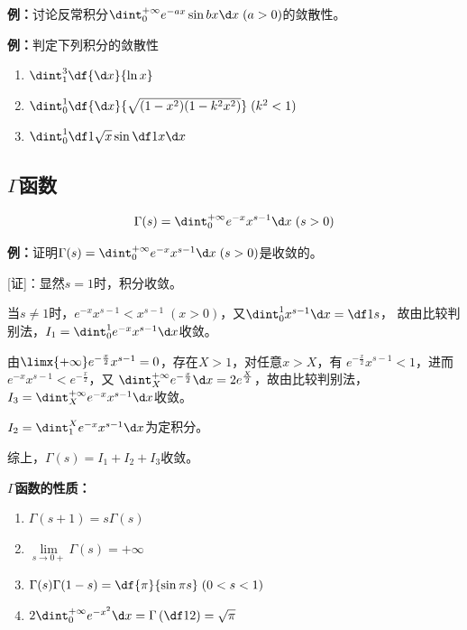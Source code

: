 {\bf 例：}讨论反常积分$\dint_0^{+\infty}e^{-ax}\sin bx\d x\;(a>0)$的敛散性。

{\bf 例：}判定下列积分的敛散性
\begin{enumerate}[(1)]
  \setlength{\itemindent}{1cm}
  \item $\dint_1^3\df{\d x}{\ln x}$ 
  \item $\dint_0^1\df{\d x}{\sqrt{(1-x^2)(1-k^2x^2)}}\;(k^2<1)$ 
  \item $\dint_0^1\df 1{\sqrt{x}}\sin\df 1x\d x$
\end{enumerate}

\subsection{$\Gamma$函数}

\begin{thx}
	$${\Gamma(s)=\dint_0^{+\infty}e^{-x}x^{s-1}\d x\;(s>0)}$$
\end{thx}

{\bf 例：}证明$\Gamma(s)=\dint_0^{+\infty}e^{-x}x^{s-1}\d x\;(s>0)$是收敛的。

[证]：显然$s=1$时，积分收敛。

当$s\ne1$时，$e^{-x}x^{s-1}<x^{s-1}\;(x>0)$，又$\dint_0^1x^{s-1}\d x=\df1s$，
故由比较判别法，$I_1=\dint_0^1e^{-x}x^{s-1}\d x$收敛。

由$\limx{+\infty}e^{-\frac x2}x^{s-1}=0$，存在$X>1$，对任意$x>X$，有
$e^{-\frac x2}x^{s-1}<1$，进而$e^{-x}x^{s-1}<e^{-\frac x2}$，又
$\dint_X^{+\infty}e^{-\frac x2}\d x=2e^{\frac X2}$，故由比较判别法，
$I_3=\dint_X^{+\infty}e^{-x}x^{s-1}\d x$收敛。

$I_2=\dint_1^Xe^{-x}x^{s-1}\d x$为定积分。

综上，$\Gamma(s)=I_1+I_2+I_3$收敛。\fin

\begin{thx}
	{\bf $\Gamma$函数的性质：}
	\begin{enumerate}
	  \item $\Gamma(s+1)=s\Gamma(s)$ 
	  \item $\lim\limits_{s\to 0+}\Gamma(s)= +\infty$ 
	  \item $\Gamma(s)\Gamma(1-s)=\df{\pi}{\sin \pi s}\;(0<s<1)$ 
	  \item $2\dint_0^{+\infty}e^{-x^2}\d x=\Gamma\left(\df 12\right)=\sqrt{\pi}$
	\end{enumerate}
\end{thx}

